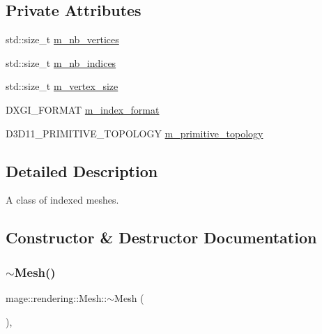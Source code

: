 \subsection*{Private Attributes}
\begin{DoxyCompactItemize}
\item 
std\+::size\+\_\+t \mbox{\hyperlink{classmage_1_1rendering_1_1_mesh_ac9c675dd7982881752e8150fc3e220bc}{m\+\_\+nb\+\_\+vertices}}
\item 
std\+::size\+\_\+t \mbox{\hyperlink{classmage_1_1rendering_1_1_mesh_a0594bc092c8765c0a09ff30d4f1441d1}{m\+\_\+nb\+\_\+indices}}
\item 
std\+::size\+\_\+t \mbox{\hyperlink{classmage_1_1rendering_1_1_mesh_a854f0aa1663a6e1497ea50aee05b55e6}{m\+\_\+vertex\+\_\+size}}
\item 
D\+X\+G\+I\+\_\+\+F\+O\+R\+M\+AT \mbox{\hyperlink{classmage_1_1rendering_1_1_mesh_a3de0213af57c9d423399ad22fd6ae7c0}{m\+\_\+index\+\_\+format}}
\item 
D3\+D11\+\_\+\+P\+R\+I\+M\+I\+T\+I\+V\+E\+\_\+\+T\+O\+P\+O\+L\+O\+GY \mbox{\hyperlink{classmage_1_1rendering_1_1_mesh_a9ae7ea29fac3acb3fe17317c21242ee9}{m\+\_\+primitive\+\_\+topology}}
\end{DoxyCompactItemize}


\subsection{Detailed Description}
A class of indexed meshes. 

\subsection{Constructor \& Destructor Documentation}
\mbox{\label{classmage_1_1rendering_1_1_mesh_a3f0a53becc293987d7ecf9ca34a230d8}} 
\subsubsection{\texorpdfstring{$\sim$\+Mesh()}{~Mesh()}}
{\footnotesize\ttfamily mage\+::rendering\+::\+Mesh\+::$\sim$\+Mesh (\begin{DoxyParamCaption}{ }\end{DoxyParamCaption})\hspace{0.3cm}{\ttfamily [virtual]}, {\ttfamily [default]}}

